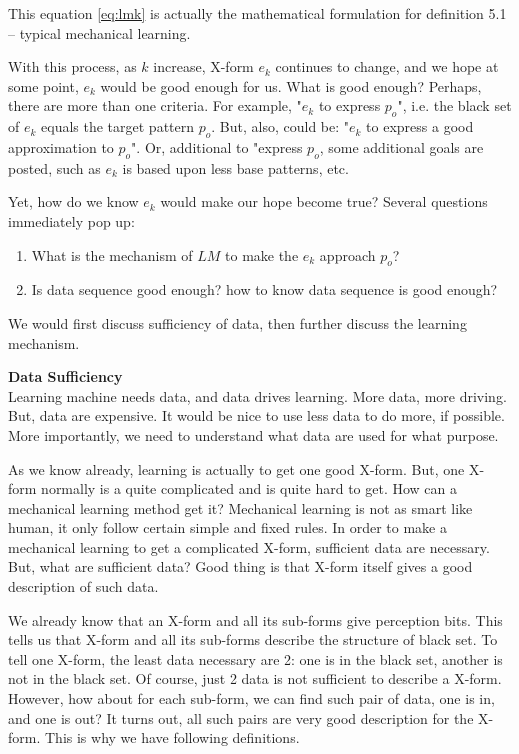 This equation  \eqref{eq:lmk}  is actually the mathematical formulation for definition 5.1 -- typical mechanical learning.  

With this process, as $k$ increase, X-form $e_k$ continues to change, and we hope at some point, $e_k$ would be good enough for us. What is good enough? Perhaps, there are more than one criteria. For example, "$e_k$ to express $p_o$", i.e. the black set of $e_k$ equals the target pattern $p_o$. But, also, could be: "$e_k$ to express a good approximation to $p_o$". Or, additional to "express $p_o$, some additional goals are posted, such as $e_k$ is based upon less base patterns, etc.

Yet, how do we know $e_k$ would make our hope become true? Several questions immediately pop up:
\begin{enumerate} [topsep=0pt,itemsep=-1ex,partopsep=1ex,parsep=1ex]
\item What is the mechanism of $LM$ to make the $e_k$ approach $p_o$?
\item Is data sequence good enough? how to know data sequence is good enough? 
\end{enumerate}

We would first discuss sufficiency of data, then further discuss the learning mechanism. 
\bigskip



{\bf Data Sufficiency} \\
Learning machine needs data, and data drives learning. More data, more driving. But, data are expensive. It would be nice to use less data to do more, if possible. More importantly, we need to understand what data are used for what purpose. 




As we know already, learning is actually to get one good X-form. But, one X-form normally is a quite complicated and is quite hard to get. How can a mechanical learning method get it? Mechanical learning is not as smart like human, it only follow certain simple and fixed rules. In order to make a mechanical learning to get a complicated X-form, sufficient data are necessary. But, what are sufficient data? Good thing is that X-form itself gives a good description of such data. 


We already know that an X-form and all its sub-forms give perception bits. This tells us that X-form and all its sub-forms describe the structure of black set. To tell one X-form, the least data necessary are 2: one is in the black set, another is not in the black set. Of course, just 2 data is not sufficient to describe a X-form. However, how about for each sub-form, we can find such pair of data, one is in, and one is out? It turns out, all such pairs are very good description for the X-form. This is why we have following definitions. 



